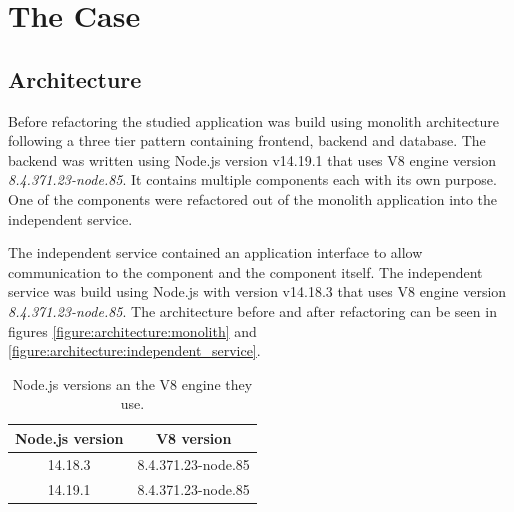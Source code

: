 \chapter{The Case\label{case}}

\section{Architecture}
Before refactoring the studied application was build using monolith architecture following a three tier pattern containing frontend, backend and database.
The backend was written using Node.js version v14.19.1 that uses V8 engine version \textit{8.4.371.23-node.85}.
It contains multiple components each with its own purpose.
One of the components were refactored out of the monolith application into the independent service.

The independent service contained an application interface to allow communication to the component and the component itself.
The independent service was build using Node.js with version v14.18.3 that uses V8 engine version \textit{8.4.371.23-node.85}.
The architecture before and after refactoring can be seen in figures \ref{figure:architecture:monolith} and \ref{figure:architecture:independent_service}.

\begin{table}[h!]
    \begin{tabular}{|c c|} 
         \hline
         Node.js version & V8 version \\ [0.5ex] 
         \hline
         14.18.3 & 8.4.371.23-node.85  \\ 
         \hline
          14.19.1 & 8.4.371.23-node.85  \\ 
         \hline
    \end{tabular}
    \caption{Node.js versions an the V8 engine they use.}
    \label{table:node:versionsWithV8}
\end{table}

